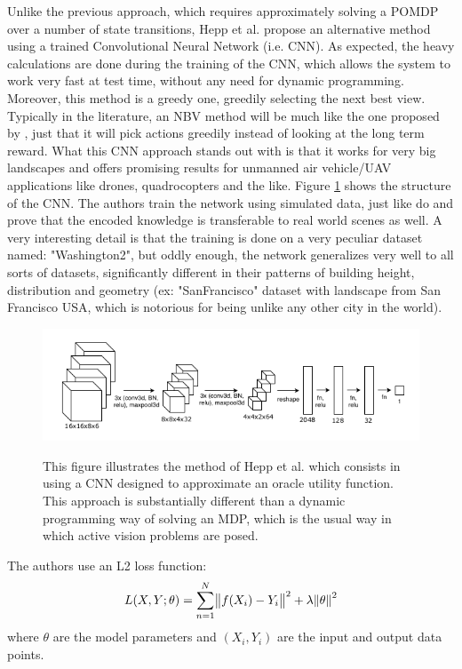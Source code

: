 \documentclass[12pt,twoside]{article}
\theoremstyle{plain}
\theoremstyle{definition}
\theoremstyle{remark}
\begin{document}
Unlike the previous approach, which requires approximately solving a POMDP over a number of state transitions, Hepp et al. \cite{hepp2018learn} propose an alternative method using a trained Convolutional Neural Network (i.e. CNN). As expected, the heavy calculations are done during the training of the CNN, which allows the system to work very fast at test time, without any need for dynamic programming. Moreover, this method is a greedy one, greedily selecting the next best view. Typically in the literature, an NBV method will be much like the one proposed by \cite{atanasov2014nonmyopic}, just that it will pick actions greedily instead of looking at the long term reward. What this CNN approach stands out with is that it works for very big landscapes and offers promising results for unmanned air vehicle/UAV applications like drones, quadrocopters and the like. Figure \ref{heppmethod1} shows the structure of the CNN. The authors train the network using simulated data, just like \cite{atanasov2014nonmyopic} do and prove that the encoded knowledge is transferable to real world scenes as well. A very interesting detail is that the training is done on a very peculiar dataset named: "Washington2", but oddly enough, the network generalizes very well to all sorts of datasets, significantly different in their patterns of building height, distribution and geometry (ex: "SanFrancisco" dataset with landscape from San Francisco USA, which is notorious for being unlike any other city in the world).  
\begin{figure}[H]
  \caption{
  This figure illustrates the method of Hepp et al. \cite{hepp2018learn} which consists in using a CNN designed to approximate an oracle utility function. This approach is substantially different than a dynamic programming way of solving an MDP, which is the usual way in which active vision problems are posed.}
  \centering
    \includegraphics[scale=0.7]{heppmethod1.png}
  \label{heppmethod1}
\end{figure}

The authors use an L2 loss function:
$$L(X,Y;\theta)=\sum_{n=1}^N \norm{f(X_i)-Y_i}^2 + \lambda \norm{\theta}^2$$ where $\theta$ are the model parameters and $(X_i, Y_i)$ are the input and output data points.
\end{document}
